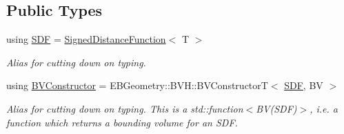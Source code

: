\subsection*{Public Types}
\begin{DoxyCompactItemize}
\item 
\mbox{\label{classUnionBVH_a5d1d64d7cabf1000fc1a804d06e103cc}} 
using \hyperlink{classUnionBVH_a5d1d64d7cabf1000fc1a804d06e103cc}{S\+DF} = \hyperlink{classSignedDistanceFunction}{Signed\+Distance\+Function}$<$ T $>$
\begin{DoxyCompactList}\small\item\em Alias for cutting down on typing. \end{DoxyCompactList}\item 
\mbox{\label{classUnionBVH_a09561e026cd6a7da1a7dbdbad5eea2c2}} 
using \hyperlink{classUnionBVH_a09561e026cd6a7da1a7dbdbad5eea2c2}{B\+V\+Constructor} = E\+B\+Geometry\+::\+B\+V\+H\+::\+B\+V\+ConstructorT$<$ \hyperlink{classUnionBVH_a5d1d64d7cabf1000fc1a804d06e103cc}{S\+DF}, BV $>$
\begin{DoxyCompactList}\small\item\em Alias for cutting down on typing. This is a std\+::function$<$\+B\+V(\+S\+D\+F)$>$, i.\+e. a function which returns a bounding volume for an S\+DF. \end{DoxyCompactList}\end{DoxyCompactItemize}
